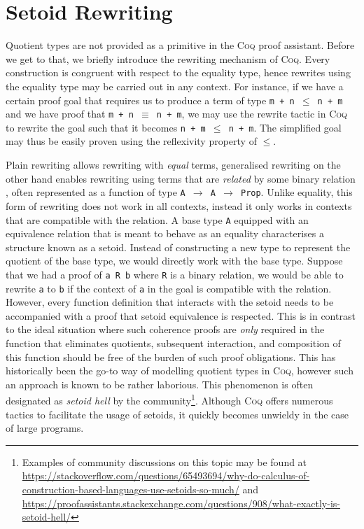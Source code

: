 \documentclass[12pt,twoside,maitrise]{dms}
\theoremstyle{definition}
\numberwithin{equation}{section}
\numberwithin{table}{chapter}
\numberwithin{figure}{chapter}
\newcommand\kw[1] {\textsf{#1}}
\newcommand\id[1] {\texttt{#1}}
\newcommand\fn[1] {\texttt{#1}}
\def\Coq{\textsc{Coq}\xspace}
\begin{document}
\section{Setoid Rewriting}

Quotient types are not provided as a primitive in the \Coq{} proof assistant.
Before we get to that, we briefly introduce the rewriting mechanism of \Coq{}.
Every construction is congruent with respect to the equality type, hence
rewrites using the equality type may be carried out in any context. For
instance, if we have a certain proof goal that requires us to produce a term of
type \fn{m + n $\le$ n + m} and we have proof that \fn{m + n $\equiv$ n + m}, we
may use the \kw{rewrite} tactic in \Coq{} to rewrite the goal such that it
becomes \fn{n + m $\le$ n + m}. The simplified goal may thus be easily proven
using the reflexivity property of $\le$.

Plain rewriting allows rewriting with \emph{equal} terms, generalised
rewriting\cite{sozeau2009new, coq-gen-rewriting} on the other hand enables
rewriting using terms that are \emph{related} by some binary relation , often
represented as a function of type \fn{A $\rightarrow$ A $\rightarrow$
  \kw{Prop}}. Unlike equality, this form of rewriting does not work in all
contexts, instead it only works in contexts that are compatible with the
relation. A base type \id{A} equipped with an equivalence relation that is meant
to behave as an equality characterises a structure known as a
setoid\cite{hofmann1995simple}. Instead of constructing a new type to represent
the quotient of the base type, we would directly work with the base type.
Suppose that we had a proof of \fn{a R b} where \id{R} is a binary relation, we
would be able to rewrite \id{a} to \id{b} if the context of \id{a} in the goal
is compatible with the relation. However, every function definition that
interacts with the setoid needs to be accompanied with a proof that setoid
equivalence is respected. This is in contrast to the ideal situation where such
coherence proofs are \emph{only} required in the function that eliminates
quotients, subsequent interaction, and composition of this function should be
free of the burden of such proof obligations. This has historically been the
go-to way of modelling quotient types in \Coq{}, however such an approach is
known to be rather laborious. This phenomenon is often designated as
\emph{setoid hell} by the community\footnote{Examples of community discussions
on this topic may be found at
\url{https://stackoverflow.com/questions/65493694/why-do-calculus-of-construction-based-languages-use-setoids-so-much/}
and
\url{https://proofassistants.stackexchange.com/questions/908/what-exactly-is-setoid-hell/}}.
Although \Coq{} offers numerous tactics to facilitate the usage of setoids, it
quickly becomes unwieldy in the case of large programs.
\end{document}
